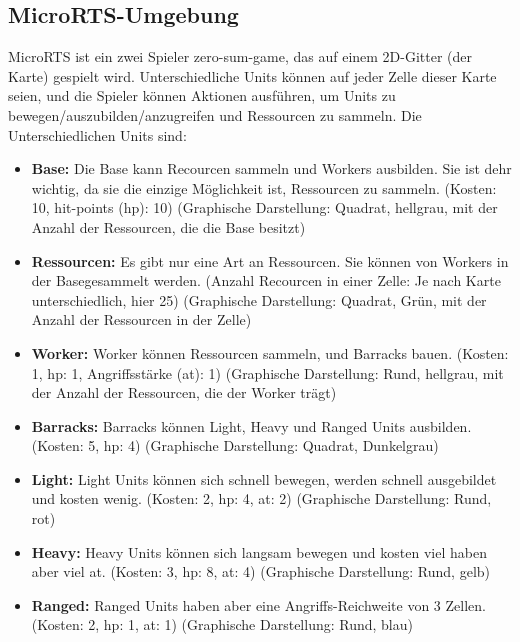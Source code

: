 \documentclass[10pt,twocolumn,letterpaper]{article}
\begin{document}




\subsection{MicroRTS-Umgebung}
\label{sec:MicroRTS-Umgebung}
MicroRTS ist ein zwei Spieler zero-sum-game, das auf einem 2D-Gitter (der Karte) gespielt wird.
Unterschiedliche Units können auf jeder Zelle dieser Karte seien, und die Spieler können Aktionen ausführen, um Units zu bewegen/auszubilden/anzugreifen und Ressourcen zu sammeln.
Die Unterschiedlichen Units sind:
\begin{itemize}
    \item \textbf{Base:} Die Base kann Recourcen sammeln und Workers ausbilden. Sie ist dehr wichtig, da sie die einzige Möglichkeit ist, Ressourcen zu sammeln. (Kosten: 10, hit-points (hp): 10) (Graphische Darstellung: Quadrat, hellgrau, mit der Anzahl der Ressourcen, die die Base besitzt)
    \item \textbf{Ressourcen:} Es gibt nur eine Art an Ressourcen. Sie können von Workers in der Basegesammelt werden. (Anzahl Recourcen in einer Zelle: Je nach Karte unterschiedlich, hier 25) (Graphische Darstellung: Quadrat, Grün, mit der Anzahl der Ressourcen in der Zelle)
    \item \textbf{Worker:} Worker können Ressourcen sammeln, und Barracks bauen. (Kosten: 1, hp: 1, Angriffsstärke (at): 1) (Graphische Darstellung: Rund, hellgrau, mit der Anzahl der Ressourcen, die der Worker trägt)
    \item \textbf{Barracks:} Barracks können Light, Heavy und Ranged Units ausbilden. (Kosten: 5, hp: 4) (Graphische Darstellung: Quadrat, Dunkelgrau)
    \item \textbf{Light:} Light Units können sich schnell bewegen, werden schnell ausgebildet und kosten wenig. (Kosten: 2, hp: 4, at: 2) (Graphische Darstellung: Rund, rot)
    \item \textbf{Heavy:} Heavy Units können sich langsam bewegen und kosten viel haben aber viel at. (Kosten: 3, hp: 8, at: 4) (Graphische Darstellung: Rund, gelb)
    \item \textbf{Ranged:} Ranged Units haben aber eine Angriffs-Reichweite von 3 Zellen. (Kosten: 2, hp: 1, at: 1) (Graphische Darstellung: Rund, blau)
\end{itemize}
\end{document}
